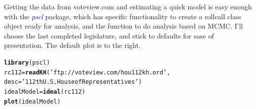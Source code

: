 \documentclass[english,nohyper,titlepage]{tufte-handout}\usepackage[]{graphicx}\usepackage[]{color}
\makeatletter
\newcommand{\hlstr}[1]{\textcolor[rgb]{0.192,0.494,0.8}{#1}}%
\newcommand{\hlstd}[1]{\textcolor[rgb]{0.345,0.345,0.345}{#1}}%
\newcommand{\hlkwb}[1]{\textcolor[rgb]{0.69,0.353,0.396}{#1}}%
\newcommand{\hlkwc}[1]{\textcolor[rgb]{0.333,0.667,0.333}{#1}}%
\newcommand{\hlkwd}[1]{\textcolor[rgb]{0.737,0.353,0.396}{\textbf{#1}}}%
\newenvironment{kframe}{%
 \def\at@end@of@kframe{}%
 \ifinner\ifhmode%
  \def\at@end@of@kframe{\end{minipage}}%
  \begin{minipage}{\columnwidth}%
 \fi\fi%
 \def\FrameCommand##1{\hskip\@totalleftmargin \hskip-\fboxsep
 \colorbox{shadecolor}{##1}\hskip-\fboxsep
     \hskip-\linewidth \hskip-\@totalleftmargin \hskip\columnwidth}%
 \MakeFramed {\advance\hsize-\width
   \@totalleftmargin\z@ \linewidth\hsize
   \@setminipage}}%
 {\par\unskip\endMakeFramed%
 \at@end@of@kframe}
\newenvironment{knitrout}{}{} %
\makeatother
\begin{document}
Getting the data from voteview.com and estimating a quick model is easy enough with the \emph{\textcolor{blue}{pscl}} package, which has specific functionality to create a rollcall class object ready for analysis, and the function to do analysis based on MCMC.  I'll choose the last completed legislature, and stick to defaults for ease of presentation.  The default plot is to the right.

\begin{knitrout}\footnotesize
{}\color{fgcolor}\begin{kframe}
\begin{alltt}
\hlkwd{library}\hlstd{(pscl)}
\hlstd{rc112} \hlkwb{=} \hlkwd{readKH}\hlstd{(}\hlstr{'ftp://voteview.com/hou112kh.ord'}\hlstd{,}
               \hlkwc{desc}\hlstd{=}\hlstr{'112th U.S. House of Representatives'}\hlstd{)}
\hlstd{idealModel} \hlkwb{=} \hlkwd{ideal}\hlstd{(rc112)}
\hlkwd{plot}\hlstd{(idealModel)}
\end{alltt}
\end{kframe}
\end{knitrout}
\end{document}
